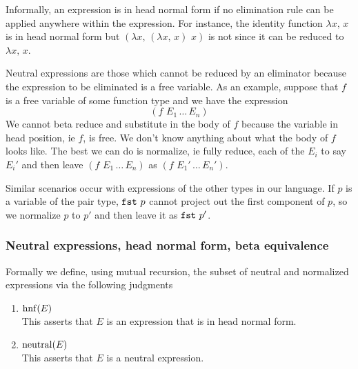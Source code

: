 \documentclass{article}
\begin{document}


Informally, an expression is in head normal form if no elimination rule can be
applied anywhere within the expression.
For instance, the identity function $\lambda x, \, x$ is in head normal form
but $(\lambda x, \, (\lambda x, \, x) \,\, x)$ is not since it can be reduced to
$\lambda x, \, x$.

Neutral expressions are those which cannot be reduced by an eliminator
because the expression to be eliminated is a free variable.
As an example, suppose that $f$ is a free variable of some function type and
we have the expression
\[ (f \,\, E_1 \, \dots \, E_n) \]
We cannot beta reduce and substitute in the body of $f$ because the
variable in head position, ie $f$, is free. We don't know anything about what
the body of $f$ looks like.
The best we can do is normalize, ie fully reduce, each of the $E_i$ to say $E_i'$
and then leave $(f \,\, E_1 \, \dots \, E_n)$ as $(f \,\, E_1' \, \dots \, E_n')$.

Similar scenarios occur with expressions of the other types in our language.
If $p$ is a variable of the pair type, $\texttt{fst} \,\, p$ cannot project out the first
component of $p$, so we normalize $p$ to $p'$ and then leave it as $\texttt{fst} \,\, p'$.


\subsubsection{Neutral expressions, head normal form, beta equivalence}
Formally we define, using mutual recursion, the subset of neutral and 
normalized expressions via the following judgments
\begin{enumerate}
  \item $\operatorname{hnf}(E)$ \\
    This asserts that $E$ is an expression that is in head normal form.
  
  \item $\operatorname{neutral}(E)$ \\
    This asserts that $E$ is a neutral expression.
\end{enumerate}
\end{document}
